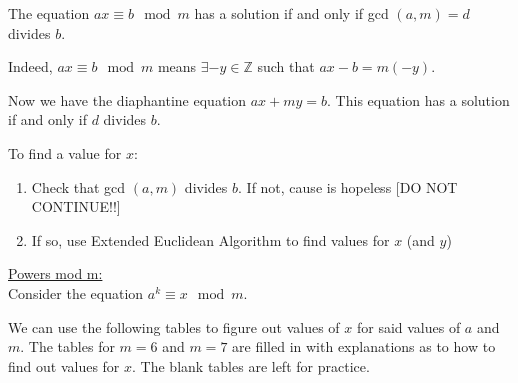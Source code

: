 The equation $ax \equiv b \mod m$ has a solution if and only if gcd $(a, m) =d$ divides $b$.
\item Indeed, $ax \equiv b \mod m$ means $\exists -y \in \mathbb{Z}$ such that $ax-b = m(-y)$.
\item Now we have the diaphantine equation $ax+my=b$. This equation has a solution if and only if $d$ divides $b$. 
\item To find a value for $x$:
\begin{enumerate}
\item Check that gcd $(a, m)$ divides $b$. If not, cause is hopeless [DO NOT CONTINUE!!]
\item If so, use Extended Euclidean Algorithm to find values for $x$ (and $y$)
\end{enumerate}
\underline{Powers mod m:}\\
Consider the equation $a^k \equiv x \mod m$.
\item We can use the following tables to figure out values of $x$ for said values of $a$ and $m$.
The tables for $m=6$ and $m=7$ are filled in with explanations as to how to find out values for $x$. The blank tables are left for practice.

